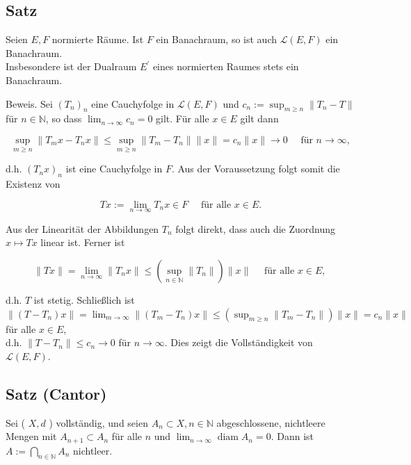 \documentclass[10pt, letterpaper]{article}
\begin{document}
\subsection*{Satz}
Seien $E, F$ normierte Räume. Ist $F$ ein Banachraum, so ist auch $\mathcal{L}(E, F)$ ein Banachraum.\\
Insbesondere ist der Dualraum $E^{\prime}$ eines normierten Raumes stets ein Banachraum.

Beweis. Sei $\left(T_{n}\right)_{n}$ eine Cauchyfolge in $\mathcal{L}(E, F)$ und $c_{n}:=\sup _{m \geq n}\left\|T_{n}-T\right\|$ für $n \in \mathbb{N}$, so dass $\lim _{n \rightarrow \infty} c_{n}=0$ gilt. Für alle $x \in E$ gilt dann

$$
\sup _{m \geq n}\left\|T_{m} x-T_{n} x\right\| \leq \sup _{m \geq n}\left\|T_{m}-T_{n}\right\|\|x\|=c_{n}\|x\| \rightarrow 0 \quad \text { für } n \rightarrow \infty,
$$

d.h. $\left(T_{n} x\right)_{n}$ ist eine Cauchyfolge in $F$. Aus der Voraussetzung folgt somit die Existenz von

$$
T x:=\lim _{n \rightarrow \infty} T_{n} x \in F \quad \text { für alle } x \in E .
$$

Aus der Linearität der Abbildungen $T_{n}$ folgt direkt, dass auch die Zuordnung $x \mapsto T x$ linear ist. Ferner ist

$$
\|T x\|=\lim _{n \rightarrow \infty}\left\|T_{n} x\right\| \leq\left(\sup _{n \in \mathbb{N}}\left\|T_{n}\right\|\right)\|x\| \quad \text { für alle } x \in E \text {, }
$$

d.h. $T$ ist stetig. Schließlich ist\\
$\left\|\left(T-T_{n}\right) x\right\|=\lim _{m \rightarrow \infty}\left\|\left(T_{m}-T_{n}\right) x\right\| \leq\left(\sup _{m \geq n}\left\|T_{m}-T_{n}\right\|\right)\|x\|=c_{n}\|x\| \quad$ für alle $x \in E$,\\
d.h. $\left\|T-T_{n}\right\| \leq c_{n} \rightarrow 0$ für $n \rightarrow \infty$. Dies zeigt die Vollständigkeit von $\mathcal{L}(E, F)$.

\subsection*{Satz (Cantor)}
Sei ( $X, d$ ) vollständig, und seien $A_{n} \subset X, n \in \mathbb{N}$ abgeschlossene, nichtleere Mengen mit $A_{n+1} \subset A_{n}$ für alle $n$ und $\lim _{n \rightarrow \infty} \operatorname{diam} A_{n}=0$. Dann ist $A:=\bigcap_{n \in \mathbb{N}} A_{n}$ nichtleer.
\end{document}
